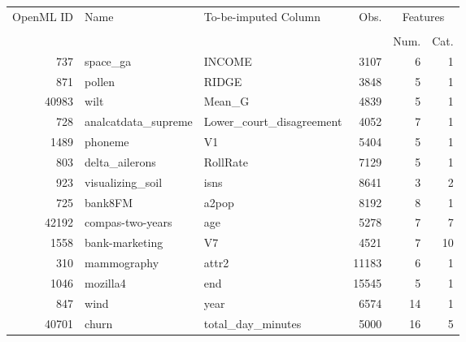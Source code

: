 \begin{table}[h!]
\centering
\begin{tabular}{rllrrr}
\toprule
\multirow{2}{*}{OpenML ID} & \multirow{2}{*}{Name} & \multirow{2}{*}{To-be-imputed Column} & \multirow{2}{*}{Obs.} & \multicolumn{2}{c}{Features} \\ \cline{5-6}
\\[-0.75em]
&                       &                    &        & Num.    & Cat.   \\
\midrule
       737 &                       space\_ga & INCOME &         3107 &                6 &                1 \\
       871 &                         pollen &     RIDGE &    3848 &                5 &                1 \\
     40983 &                           wilt &    Mean\_G &     4839 &                5 &                1 \\
       728 &            analcatdata\_supreme &    Lower\_court\_disagreement &     4052 &                7 &                1 \\
      1489 &                        phoneme &     V1 &    5404 &                5 &                1 \\
       803 &                 delta\_ailerons &   RollRate &      7129 &                5 &                1 \\
       923 &               visualizing\_soil &     isns &    8641 &                3 &                2 \\
       725 &                        bank8FM &     a2pop &    8192 &                8 &                1 \\
     42192 &               compas-two-years &   age &      5278 &                7 &                7 \\
      1558 &                 bank-marketing &    V7 &     4521 &                7 &               10 \\
       310 &                    mammography &   attr2 &     11183 &                6 &                1 \\
      1046 &                       mozilla4 &    end &    15545 &                5 &                1 \\
       847 &                           wind &      year &   6574 &               14 &                1 \\
     40701 &                          churn &    total\_day\_minutes &     5000 &               16 &                5 \\

\end{tabular}
\end{table}
